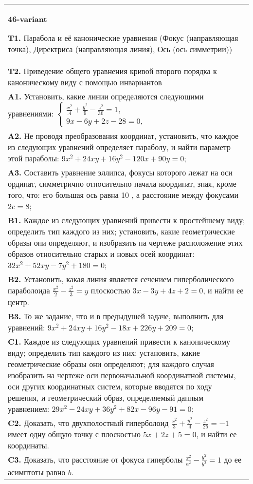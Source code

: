 \documentclass{article}
\begin{document}
\begin{tabular}{m{17cm}}
\textbf{46-variant}
\newline

\textbf{T1.} Парабола и её канонические уравнения (Фокус (направляющая точка), Директриса (направляющая линия), Ось (ось симметрии)) \\
\textbf{T2.} Приведение общего уравнения кривой второго порядка к каноническому виду с помощью инвариантов \\
\textbf{A1.} Установить, какие линии определяются следующими уравнениями: $\left\{\begin{array}{l}\frac{x^2}{.4}+\frac{y^2}{9}-\frac{z^2}{36}=1, \\ 9 x-6 y+2 z-28=0,\end{array}\right.$ \\
\textbf{A2.} Не проводя преобразования координат, установить, что каждое из следующих уравнений определяет параболу, и найти параметр этой параболы: $9 x^2+24 x y+16 y^2-120 x+90 y=0$; \\
\textbf{A3.} Составить уравнение эллипса, фокусы которого лежат на оси ординат, симметрично относительно начала координат, зная, кроме того, что: его большая ось равна 10 , а расстояние между фокусами $2 c=8$; \\
\textbf{B1.} Каждое из следующих уравнений привести к простейшему виду; определить тип каждого из них; установить, какие геометрические образы они определяют, и изобразить на чертеже расположение этих образов относительно старых и новых осей координат: $32 x^2+52 x y-7 y^2+180=0$; \\
\textbf{B2.} Установить, какая линия является сечением гиперболического параболоида $\frac{x^2}{2}-\frac{z^2}{3}=y$ плоскостью $3 x-3 y+4 z+2=0$, и найти ее центр. \\
\textbf{B3.} То же задание, что и в предыдушей задаче, выполнить для уравнений: $9 x^2+24 x y+16 y^2-18 x+226 y+209=0$; \\
\textbf{C1.} Каждое из следующих уравнений привести к каноническому виду; определить тип каждого из них; установить, какие геометрические образы они определяют; для каждого случая изобразить на чертеже оси первоначальной координатной системы, оси других координатных систем, которые вводятся по ходу решения, и геометрический образ, определяемый данным уравнением: $29 x^2-24 x y+36 y^2+82 x-96 y-91=0$; \\
\textbf{C2.} Доказать, что двухполостный гиперболоид $\frac{x^2}{3}+\frac{y^2}{4}-\frac{z^2}{25}=-1$ имеет одну общую точку с плоскостью $5 x+2 z+5=0$, и найти ее координаты. \\
\textbf{C3.} Доказать, что расстояние от фокуса гиперболы $\frac{x^2}{a^2}-\frac{y^2}{b^2}=1$ до ее асимптоты равно $b$. \\

\end{tabular}
\vspace{1cm}
\end{document}
